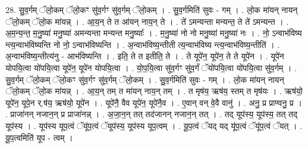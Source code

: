 \documentclass[17pt]{extarticle}
\begin{document}
28. सु॒व॒र्गम् ॅलो॒कम् ॅलो॒कꣳ सु॑व॒र्गꣳ सु॑व॒र्गम् ॅलो॒कम् । . सु॒व॒र्गमिति॑ सुवः - गम् । . लो॒क मा॑यन् नायन् ॅलो॒कम् ॅलो॒क मा॑यन्न् । . आ॒य॒न् ते त आ॑यन् नाय॒न् ते । . ते॑ ऽमन्यन्ता मन्यन्त॒ ते ते॑ ऽमन्यन्त । . अ॒म॒न्य॒न्त॒ म॒नु॒ष्या॑ मनु॒ष्या॑ अमन्यन्ता मन्यन्त मनु॒ष्याः᳚ । . म॒नु॒ष्या॑ नो नो मनु॒ष्या॑ मनु॒ष्या॑ नः । . नो॒ ऽन्वाभ॑विष्य न्त्य॒न्वाभ॑विष्यन्ति नो नो॒ ऽन्वाभ॑विष्यन्ति । . अ॒न्वाभ॑विष्य॒न्तीती त्य॒न्वाभ॑विष्य न्त्य॒न्वाभ॑विष्य॒न्तीति॑ । . अ॒न्वाभ॑विष्य॒न्तीत्य॑नु - आभ॑विष्यन्ति । . इति॒ ते त इतीति॒ ते । . ते यूपे॑न॒ यूपे॑न॒ ते ते यूपे॑न । . यूपे॑न योपयि॒त्वा यो॑पयि॒त्वा यूपे॑न॒ यूपे॑न योपयि॒त्वा । . यो॒प॒यि॒त्वा सु॑व॒र्गꣳ सु॑व॒र्गं ॅयो॑पयि॒त्वा यो॑पयि॒त्वा सु॑व॒र्गम् । . सु॒व॒र्गम् ॅलो॒कम् ॅलो॒कꣳ सु॑व॒र्गꣳ सु॑व॒र्गम् ॅलो॒कम् । . सु॒व॒र्गमिति॑ सुवः - गम् । . लो॒क मा॑यन् नायन् ॅलो॒कम् ॅलो॒क मा॑यन्न् । . आ॒य॒न् तम् त मा॑यन् नाय॒न् तम् । . त मृष॑य॒ ऋष॑य॒ स्तम् त मृष॑यः । . ऋष॑यो॒ यूपे॑न॒ यूपे॒न र्.ष॑य॒ ऋष॑यो॒ यूपे॑न । . यूपे॑नै॒ वैव यूपे॑न॒ यूपे॑नै॒व । . ए॒वान् वन् वे॒वै वानु॑ । . अनु॒ प्र प्राण्वनु॒ प्र । . प्राजा॑नन् नजान॒न् प्र प्राजा॑नन्न् । . अ॒जा॒न॒न् तत् तद॑जानन् नजान॒न् तत् । . तद् यूप॑स्य॒ यूप॑स्य॒ तत् तद् यूप॑स्य । . यूप॑स्य यूप॒त्वं ॅयू॑प॒त्वं ॅयूप॑स्य॒ यूप॑स्य यूप॒त्वम् । . यू॒प॒त्वं ॅयद् यद् यू॑प॒त्वं ॅयू॑प॒त्वं ॅयत् । . यू॒प॒त्वमिति॑ यूप - त्वम् । \newline
\end{document}
